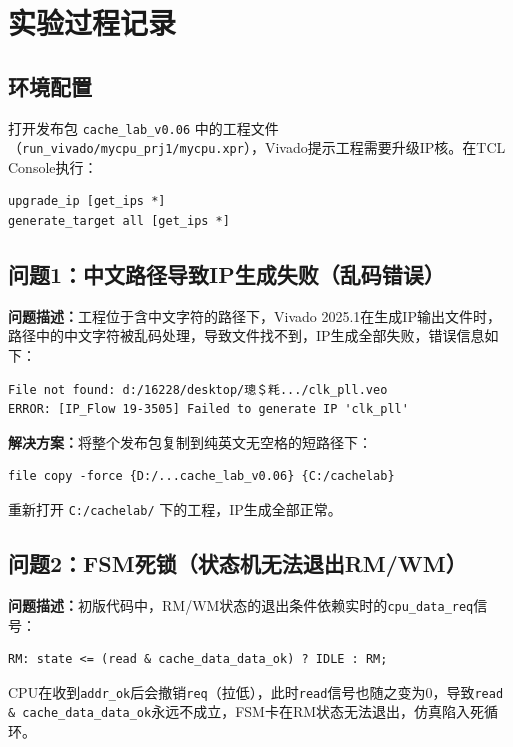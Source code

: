 \section{实验过程记录}

\subsection{环境配置}

打开发布包 \texttt{cache\_lab\_v0.06} 中的工程文件（\texttt{run\_vivado/mycpu\_prj1/mycpu.xpr}），Vivado提示工程需要升级IP核。在TCL Console执行：

\begin{verbatim}
upgrade_ip [get_ips *]
generate_target all [get_ips *]
\end{verbatim}

\subsection{问题1：中文路径导致IP生成失败（乱码错误）}

\textbf{问题描述：}工程位于含中文字符的路径下，Vivado 2025.1在生成IP输出文件时，路径中的中文字符被乱码处理，导致文件找不到，IP生成全部失败，错误信息如下：

\begin{verbatim}
File not found: d:/16228/desktop/璁＄粍.../clk_pll.veo
ERROR: [IP_Flow 19-3505] Failed to generate IP 'clk_pll'
\end{verbatim}

\textbf{解决方案：}将整个发布包复制到纯英文无空格的短路径下：

\begin{verbatim}
file copy -force {D:/...cache_lab_v0.06} {C:/cachelab}
\end{verbatim}

重新打开 \texttt{C:/cachelab/} 下的工程，IP生成全部正常。

\subsection{问题2：FSM死锁（状态机无法退出RM/WM）}

\textbf{问题描述：}初版代码中，RM/WM状态的退出条件依赖实时的\texttt{cpu\_data\_req}信号：

\begin{verbatim}
RM: state <= (read & cache_data_data_ok) ? IDLE : RM;
\end{verbatim}

CPU在收到\texttt{addr\_ok}后会撤销\texttt{req}（拉低），此时\texttt{read}信号也随之变为0，导致\texttt{read \& cache\_data\_data\_ok}永远不成立，FSM卡在RM状态无法退出，仿真陷入死循环。

